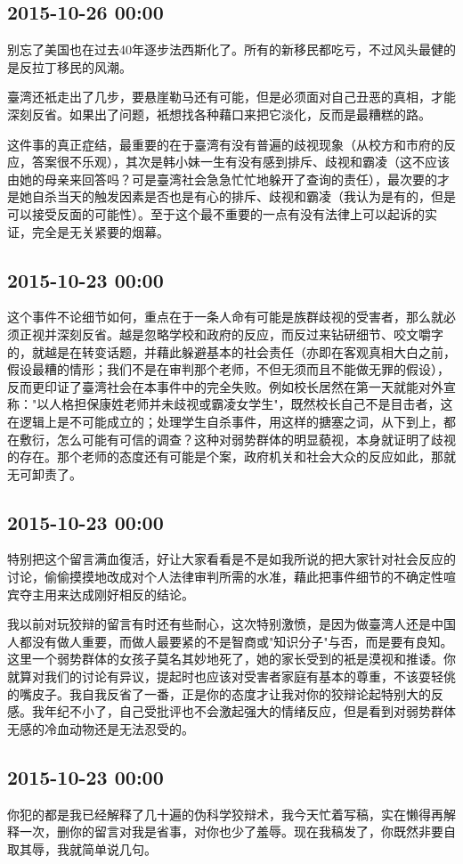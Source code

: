 \documentclass[twocolumn]{ctexart}
\begin{document}
\subsection*{2015-10-26 00:00}
别忘了美国也在过去40年逐步法西斯化了。所有的新移民都吃亏，不过风头最健的是反拉丁移民的风潮。

臺湾还衹走出了几步，要悬崖勒马还有可能，但是必须面对自己丑恶的真相，才能深刻反省。如果出了问题，衹想找各种藉口来把它淡化，反而是最糟糕的路。

这件事的真正症结，最重要的在于臺湾有没有普遍的歧视现象（从校方和市府的反应，答案很不乐观），其次是韩小妹一生有没有感到排斥、歧视和霸凌（这不应该由她的母亲来回答吗？可是臺湾社会急急忙忙地躲开了查询的责任），最次要的才是她自杀当天的触发因素是否也是有心的排斥、歧视和霸凌（我认为是有的，但是可以接受反面的可能性）。至于这个最不重要的一点有没有法律上可以起诉的实证，完全是无关紧要的烟幕。\subsection*{2015-10-23 00:00}
这个事件不论细节如何，重点在于一条人命有可能是族群歧视的受害者，那么就必须正视并深刻反省。越是忽略学校和政府的反应，而反过来钻研细节、咬文嚼字的，就越是在转变话题，并藉此躲避基本的社会责任（亦即在客观真相大白之前，假设最糟的情形；我们不是在审判那个老师，不但无须而且不能做无罪的假设），反而更印证了臺湾社会在本事件中的完全失败。例如校长居然在第一天就能对外宣称："以人格担保康姓老师并未歧视或霸凌女学生"，既然校长自己不是目击者，这在逻辑上是不可能成立的；处理学生自杀事件，用这样的搪塞之词，从下到上，都在敷衍，怎么可能有可信的调查？这种对弱势群体的明显藐视，本身就证明了歧视的存在。那个老师的态度还有可能是个案，政府机关和社会大众的反应如此，那就无可卸责了。\subsection*{2015-10-23 00:00}
特别把这个留言满血復活，好让大家看看是不是如我所说的把大家针对社会反应的讨论，偷偷摸摸地改成对个人法律审判所需的水准，藉此把事件细节的不确定性喧宾夺主用来达成刚好相反的结论。

我以前对玩狡辩的留言有时还有些耐心，这次特别激愤，是因为做臺湾人还是中国人都没有做人重要，而做人最要紧的不是智商或"知识分子"与否，而是要有良知。这里一个弱势群体的女孩子莫名其妙地死了，她的家长受到的衹是漠视和推诿。你就算对我们的讨论有异议，提起时也应该对受害者家庭有基本的尊重，不该耍轻佻的嘴皮子。我自我反省了一番，正是你的态度才让我对你的狡辩论起特别大的反感。我年纪不小了，自己受批评也不会激起强大的情绪反应，但是看到对弱势群体无感的冷血动物还是无法忍受的。\subsection*{2015-10-23 00:00}
你犯的都是我已经解释了几十遍的伪科学狡辩术，我今天忙着写稿，实在懒得再解释一次，删你的留言对我是省事，对你也少了羞辱。现在我稿发了，你既然非要自取其辱，我就简单说几句。
\end{document}
